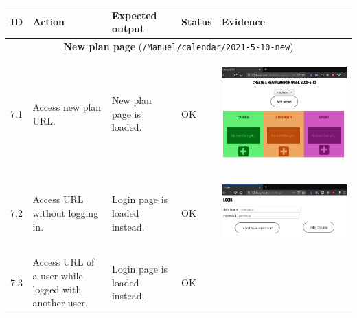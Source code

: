 \documentclass[12pt,twoside,titlepage,a4paper]{article}
\theoremstyle{definicion}
\theoremstyle{lema}
\theoremstyle{teorema}
\theoremstyle{corolario}
\theoremstyle{ejemplo}
\theoremstyle{nota}
\begin{document}
\begin{table}[!h]
	\centering
	\begin{tabular}{|m{0.6cm}|m{2.9cm}|m{3.6cm}|m{1.1cm}|m{5.9cm}|}
		\hline
		\textbf{ID} & \textbf{Action} & \textbf{Expected output} & \textbf{Status} & \textbf{Evidence} \\ 
		\hline
		\multicolumn{5}{|c|}{\textbf{New plan page} (\texttt{/Manuel/calendar/2021-5-10-new})} \\ 
		\hline
		7.1 & Access new plan URL. & New plan page is loaded. & OK &
		\begin{center}\includegraphics[scale=0.22]{newplan1.png}\end{center} \\
		\hline
		7.2 & Access URL without logging in. & Login page is loaded instead. & OK &
		\begin{center}\includegraphics[scale=0.22]{register2-login1.png}\end{center} \\
		\hline
		7.3 & Access URL of a user while logged with another user. & Login page is loaded instead. & OK &

\end{tabular}
\end{table}
\end{document}
